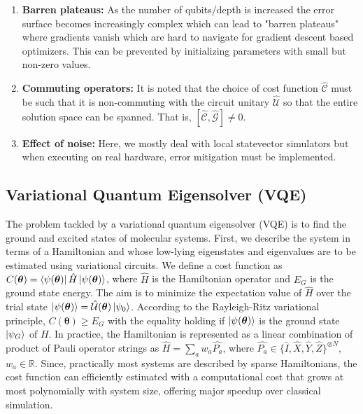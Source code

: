 \documentclass[11pt,a4paper]{article}
\begin{document}
\begin{enumerate}
    \item \textbf{Barren plateaus:} As the number of qubits/depth is increased the error surface becomes increasingly complex which can lead to "barren plateaus" where gradients vanish which are hard to navigate for gradient descent based optimizers. This can be prevented by initializing parameters with small but non-zero values.
    \item \textbf{Commuting operators:} It is noted that the choice of cost function $\mathcal{\hat{C}}$ must be such that it is non-commuting with the circuit unitary  $\mathcal{\hat{U}}$ so that the entire solution space can be spanned. That is, $[\mathcal{\hat{C}}, \mathcal{\hat{G}}] \neq 0$.
    \item \textbf{Effect of noise:} Here, we mostly deal with local statevector simulators but when executing on real hardware, error mitigation must be implemented.
\end{enumerate}

\subsection{Variational Quantum Eigensolver (VQE)}

The problem tackled by a variational quantum eigensolver (VQE) is to find the ground and excited states of molecular systems. First, we describe the system in terms of a Hamiltonian and whose low-lying eigenstates and eigenvalues are to be estimated using variational circuits. We define a cost function as $C(\boldsymbol{\theta}) = \bra{\psi(\boldsymbol{\theta})}\hat{H}\ket{\psi(\boldsymbol{\theta})}$, where $\hat{H}$ is the Hamiltonian operator and $E_G$ is the ground state energy. The aim is to minimize the expectation value of $\hat{H}$ over the trial state $\ket{\psi(\boldsymbol{\theta})} = \mathcal{\hat{U}}(\boldsymbol{\theta})\ket{\psi_0}$. According to the Rayleigh-Ritz variational principle, $C(\boldsymbol{\theta}) \geq E_G$ with the equality holding if $\ket{\psi(\boldsymbol{\theta})}$ is the ground state $\ket{\psi_G}$ of $H$. In practice, the Hamiltonian is represented as a linear combination of product of Pauli operator strings as $\hat{H} = \sum_{a} w_a \hat{P_a}$, where $\hat{P_a} \in \{\hat{I}, \hat{X}, \hat{Y}, \hat{Z}\}^{\otimes N}$, $w_a \in \mathbb{R}$. Since, practically most systems are described by sparse Hamiltonians, the cost function can efficiently estimated with a computational cost that grows at most polynomially with system size, offering major speedup over classical simulation.
\end{document}
